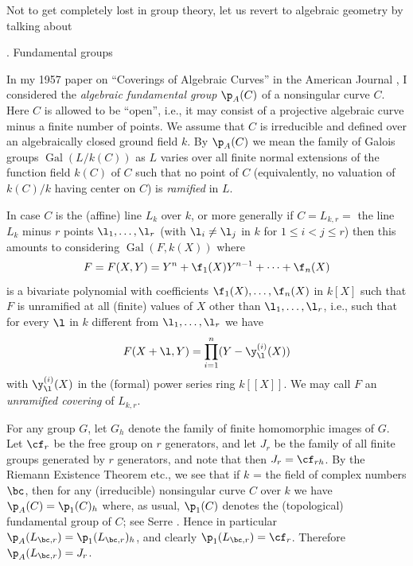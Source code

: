 Not to get completely lost in group theory, let us revert 
to algebraic 
geometry by talking about 

. Fundamental groups\endheading

In my 1957 paper on ``Coverings of Algebraic Curves'' in 
the American
Journal \cite{A3}, I considered the {\it algebraic 
fundamental group}
$\p_A(C)$ of a nonsingular curve $C$. Here $C$ is allowed 
to be ``open'', 
i.e., it may consist of a projective algebraic curve minus 
a finite number of 
points. We assume that $C$ is irreducible and defined over 
an algebraically 
closed ground field $k$. By $\p_A(C)$ we mean the family 
of Galois groups 
$\operatorname{Gal}
(L/k(C))$ as $L$ varies over all finite normal extensions 
of the function 
field $k(C)$ of $C$ such that no point of $C$ 
(equivalently, no valuation of 
$k(C)/k$ having center on $C$) is {\it ramified} in $L$.

In case $C$ is the (affine) line $L_k$ over $k$, or more 
generally if 
$C=L_{k,r}=$ the line $L_k$ minus $r$ points 
$\l_1,\dots,\l_r$ 
(with $\l_i\neq\l_j$ in $k$ for $1\leq i < j\leq r$) then 
this amounts to 
considering 
$\operatorname{Gal}(F,k(X))$ where
$$
F=F(X,Y)=Y^n+\f_1(X)Y^{n-1}+\dots+\f_n(X)
$$
is a bivariate polynomial with coefficients 
$\f_1(X),\dots,\f_n(X)$ in $k[X]$
such that $F$ is unramified at all (finite) values of $X$ 
other than
$\l_1,\dots,\l_r$, i.e., such that for every $\l$ in $k$ 
different from
$\l_1,\dots,\l_r$ we have
$$
F(X+\l,Y)=\prod_{i=1}^n(Y-\y_{\l}^{(i)}(X))
$$
with $\y_{\l}^{(i)}(X)$ in the (formal) power series ring 
$k[[X]]$.
We may call $F$ an {\it unramified covering} of $L_{k,r}$.
  
For any group $G$\<, let $G_h$ denote the family of finite 
homomorphic images of
$G$. Let $\cf_r$ be the free group on $r$ generators, and 
let $J_r$ be the
family of all finite groups generated by $r$ generators, 
and note that then
$J_r=\cf_{rh}$. By the Riemann Existence Theorem etc., we 
see that
if $k$ = the field of complex numbers $\bc$, then for any 
(irreducible) nonsingular curve $C$ over $k$ we have
$\p_A(C)=\p_1(C)_h$ where, as usual, $\p_1(C)$ denotes the 
(topological) fundamental group of $C$; see Serre 
\cite{S1}. Hence in particular
$\p_A(L_{\bc,r})=\p_1(L_{\bc,r})_h$, and clearly 
$\p_1(L_{\bc,r})=\cf_r$.
Therefore $\p_A(L_{\bc,r})=J_r$.

